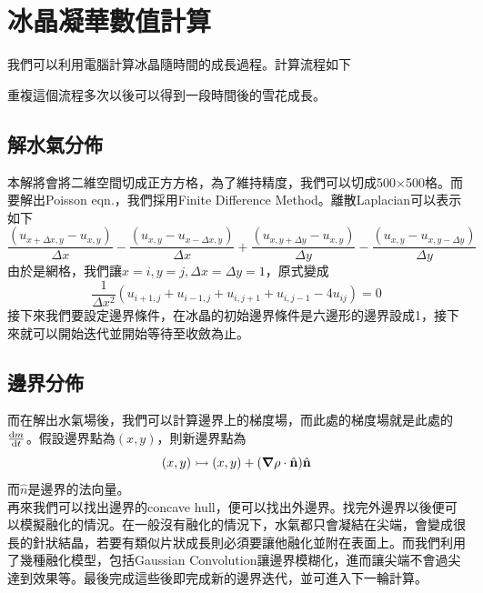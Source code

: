 \documentclass[12pt, a4paper]{article}
\theoremstyle{mystyle}	%
\begin{document}
\section{冰晶凝華數值計算}
我們可以利用電腦計算冰晶隨時間的成長過程。計算流程如下

\vspace{0.5 cm}
\begin{center}
\end{center}
重複這個流程多次以後可以得到一段時間後的雪花成長。
\subsection{解水氣分佈}
本解將會將二維空間切成正方方格，為了維持精度，我們可以切成500\(\times \)500格。而要解出Poisson eqn.，我們採用Finite Difference Method。離散Laplacian可以表示如下
\begin{equation}
    \frac{(u_{x+\Delta x, y}-u_{x, y})}{\Delta x} - \frac{(u_{x, y}-u_{x - \Delta x, y})}{\Delta x} + \frac{(u_{x, y + \Delta y}-u_{x, y})}{\Delta y} - \frac{(u_{x, y}-u_{x, y - \Delta y})}{\Delta y} 
\end{equation}
由於是網格，我們讓\(x = i, y = j, \Delta x = \Delta y = 1\)，原式變成
\begin{equation}
    \frac{1}{\Delta x^2} (u_{i+1,j} + u_{i-1,j} + u_{i,j+1} + u_{i,j-1} - 4 u_{ij}) = 0
\end{equation}
接下來我們要設定邊界條件，在冰晶的初始邊界條件是六邊形的邊界設成1，接下來就可以開始迭代並開始等待至收斂為止。
\subsection{邊界分佈}
而在解出水氣場後，我們可以計算邊界上的梯度場，而此處的梯度場就是此處的\(\dv{m}{t}\)。假設邊界點為\((x, y)\)，則新邊界點為
\begin{equation}
    (x, y) \rightarrowtail (x, y) + (\grad{\rho} \cdot \hat{\vb{n}}) \hat{\vb{n}}
\end{equation}
而\(\hat{n}\)是邊界的法向量。\\
再來我們可以找出邊界的concave hull，便可以找出外邊界。找完外邊界以後便可以模擬融化的情況。在一般沒有融化的情況下，水氣都只會凝結在尖端，會變成很長的針狀結晶，若要有類似片狀成長則必須要讓他融化並附在表面上。而我們利用了幾種融化模型，包括Gaussian Convolution讓邊界模糊化，進而讓尖端不會過尖達到效果等。最後完成這些後即完成新的邊界迭代，並可進入下一輪計算。
\end{document}
